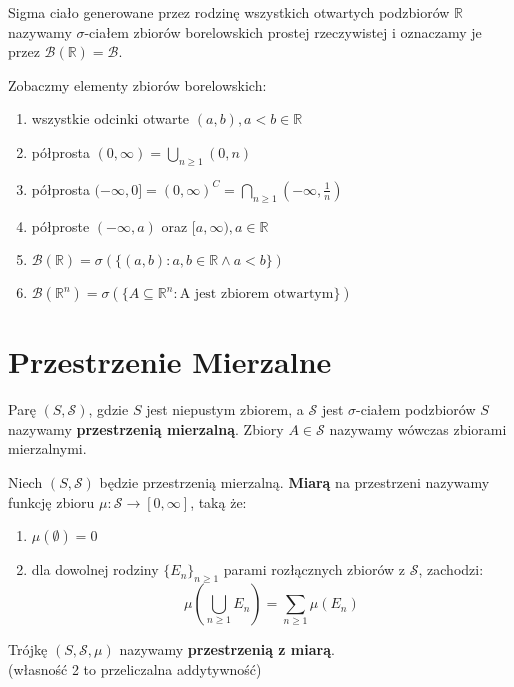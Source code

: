 \documentclass{article}
\newenvironment{definition}[1]{%
    \trivlist
    \item[\hskip\labelsep\textbf{Definition. #1.}]
    \ignorespaces
}{%
    \endtrivlist
}
\newenvironment{information}[1]{%
    \trivlist
    \item[\hskip\labelsep\textbf{Information. #1.}]
    \ignorespaces
}{%
    \endtrivlist
}
\begin{document}
\begin{definition}{Sigma ciało zbiorów borelowskich}
    Sigma ciało generowane przez rodzinę wszystkich otwartych podzbiorów $\mathbb{R}$ nazywamy $\sigma$-ciałem zbiorów borelowskich prostej rzeczywistej i oznaczamy je przez $\mathcal{B}(\mathbb{R}) = \mathcal{B}$.
\end{definition}

\begin{information}{Elementy $\mathcal{B}(\mathbb{R})$}
    Zobaczmy elementy zbiorów borelowskich:
    \begin{enumerate}
        \item wszystkie odcinki otwarte \( (a,b), a < b \in \mathbb{R}\)
        \item półprosta \( (0, \infty) = \bigcup_{n\geq 1} (0, n) \)
        \item półprosta \( (-\infty, 0] = (0,\infty)^{C} =  \bigcap_{n\geq 1} (-\infty, \frac{1}{n}) \)
        \item półproste \( (-\infty, a) \) oraz \( [a, \infty), a \in \mathbb{R} \)
        \item \( \mathcal{B}(\mathbb{R}) = \sigma(\{ (a,b) : a,b \in \mathbb{R} \land a < b \})\)
        \item \( \mathcal{B}(\mathbb{R}^n) = \sigma(\{ A \subseteq \mathbb{R}^n : \text{A jest zbiorem otwartym}\})\)
    \end{enumerate}
\end{information}

\section{Przestrzenie Mierzalne}

\begin{definition}{Przestrzeń mierzalna}
    Parę $(S, \mathcal{S})$, gdzie $S$ jest niepustym zbiorem, a $\mathcal{S}$ jest $\sigma$-ciałem podzbiorów $S$ nazywamy \textbf{przestrzenią mierzalną}. Zbiory $A \in \mathcal{S}$ nazywamy wówczas zbiorami mierzalnymi.
\end{definition}

\begin{definition}{Miara}
    Niech $(S,\mathcal{S})$ będzie przestrzenią mierzalną. \textbf{Miarą} na przestrzeni nazywamy funkcję zbioru $\mu: \mathcal{S} \rightarrow [0,\infty]$, taką że:
    \begin{enumerate}
        \item $\mu(\emptyset) = 0$
        \item dla dowolnej rodziny $\{E_n\}_{n\geq 1}$ parami rozłącznych zbiorów z $\mathcal{S}$, zachodzi:
        \[
        \mu \left(\bigcup_{n\geq 1} E_n \right) = \sum_{n\geq 1} \mu (E_n)
        \]
    \end{enumerate}
    Trójkę $(S,\mathcal{S}, \mu)$ nazywamy \textbf{przestrzenią z miarą}. \\
    (własność 2 to przeliczalna addytywność)
\end{definition}
\end{document}
